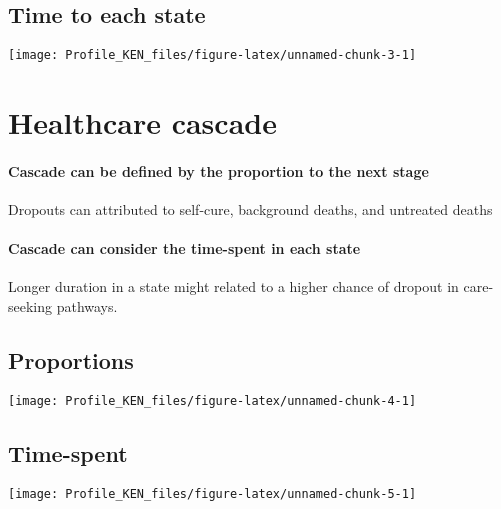 \documentclass[
]{article}
\begin{document}
\hypertarget{time-to-each-state}{%
\subsection{Time to each state}\label{time-to-each-state}}

\texttt{[image: Profile\_KEN\_files/figure-latex/unnamed-chunk-3-1]}

\newpage

\hypertarget{healthcare-cascade}{%
\section{Healthcare cascade}\label{healthcare-cascade}}

\hypertarget{cascade-can-be-defined-by-the-proportion-to-the-next-stage}{%
\paragraph{Cascade can be defined by the proportion to the next
stage}\label{cascade-can-be-defined-by-the-proportion-to-the-next-stage}}

Dropouts can attributed to self-cure, background deaths, and untreated
deaths

\hypertarget{cascade-can-consider-the-time-spent-in-each-state}{%
\paragraph{Cascade can consider the time-spent in each
state}\label{cascade-can-consider-the-time-spent-in-each-state}}

Longer duration in a state might related to a higher chance of dropout
in care-seeking pathways.

\hypertarget{proportions}{%
\subsection{Proportions}\label{proportions}}

\texttt{[image: Profile\_KEN\_files/figure-latex/unnamed-chunk-4-1]}

\hypertarget{time-spent}{%
\subsection{Time-spent}\label{time-spent}}

\texttt{[image: Profile\_KEN\_files/figure-latex/unnamed-chunk-5-1]}
\end{document}
